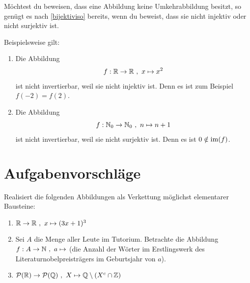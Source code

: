 \begin{bem} \label{invwiderleg}
    Möchtest du beweisen, dass eine Abbildung keine Umkehrabbildung besitzt, so genügt es nach \cref{bijektiviso} bereits, wenn du beweist, dass sie nicht injektiv oder nicht surjektiv ist.
\end{bem}


\begin{bsp}
    Beispielsweise gilt:
    \begin{enumerate}
        \item Die Abbildung
            \[ f : \R \to \R \ ,\ x\mapsto x^2\]
        ist nicht invertierbar, weil sie nicht injektiv ist. Denn es ist zum Beispiel $f(-2)=f(2)$.
        \item Die Abbildung
            \[ f : \N_0 \to \N_0 \ ,\ n \mapsto n+1 \]
        ist nicht invertierbar, weil sie nicht surjektiv ist. Denn es ist $0\notin \operatorname{im}(f)$.
    \end{enumerate}
\end{bsp}





\clearpage
\section{Aufgabenvorschläge}


\begin{aufg}
    Realisiert die folgenden Abbildungen als Verkettung möglichst elementarer Bausteine:
    \begin{enumerate}
        \item $\mathbb R\to \mathbb R \ ,\ x\mapsto (3x+1)^3$
        \item Sei $A$ die Menge aller Leute im Tutorium. Betrachte die Abbildung $f:A\to \mathbb N \ ,\ a\mapsto$ (die Anzahl der Wörter im Erstlingswerk des Literaturnobelpreisträgers im Geburtsjahr von $a$).
        \item $\mathcal P(\mathbb R) \to \mathcal P(\mathbb Q) \ ,\ X \mapsto \mathbb Q \setminus (X^c\cap \mathbb Z)$
    \end{enumerate}
\end{aufg}


